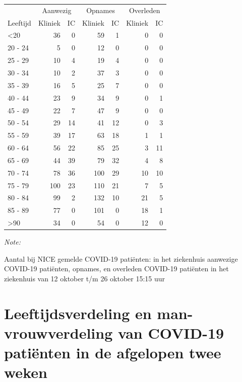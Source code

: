 \documentclass[
  english,
  man,floatsintext]{apa6}
\begin{document}
\begin{table}
\centering\begingroup\fontsize{10}{12}\selectfont

\begin{threeparttable}
\begin{tabular}{lrrrrrr}
\toprule
\multicolumn{1}{c}{ } & \multicolumn{2}{c}{Aanwezig} & \multicolumn{2}{c}{Opnames} & \multicolumn{2}{c}{Overleden} \\
\cmidrule(l{3pt}r{3pt}){2-3} \cmidrule(l{3pt}r{3pt}){4-5} \cmidrule(l{3pt}r{3pt}){6-7}
Leeftijd & Kliniek & IC & Kliniek & IC & Kliniek & IC\\
\midrule
<20 & 36 & 0 & 59 & 1 & 0 & 0\\
20 - 24 & 5 & 0 & 12 & 0 & 0 & 0\\
25 - 29 & 10 & 4 & 19 & 4 & 0 & 0\\
30 - 34 & 10 & 2 & 37 & 3 & 0 & 0\\
35 - 39 & 16 & 5 & 25 & 7 & 0 & 0\\
40 - 44 & 23 & 9 & 34 & 9 & 0 & 1\\
45 - 49 & 22 & 7 & 47 & 9 & 0 & 0\\
50 - 54 & 29 & 14 & 41 & 12 & 0 & 3\\
55 - 59 & 39 & 17 & 63 & 18 & 1 & 1\\
60 - 64 & 56 & 22 & 85 & 25 & 3 & 11\\
65 - 69 & 44 & 39 & 79 & 32 & 4 & 8\\
70 - 74 & 78 & 36 & 100 & 29 & 10 & 10\\
75 - 79 & 100 & 23 & 110 & 21 & 7 & 5\\
80 - 84 & 99 & 2 & 132 & 10 & 21 & 5\\
85 - 89 & 77 & 0 & 101 & 0 & 18 & 1\\
>90 & 34 & 0 & 54 & 0 & 12 & 0\\
\bottomrule
\end{tabular}
\begin{tablenotes}
\item \textit{Note: } 
\item Aantal bij NICE gemelde COVID-19 patiënten: in het ziekenhuis aanwezige COVID-19 patiënten, opnames, en overleden COVID-19 patiënten in het ziekenhuis van 12 oktober t/m 26 oktober 15:15 uur
\end{tablenotes}
\end{threeparttable}
\endgroup{}
\end{table}

\newpage

\hypertarget{leeftijdsverdeling-en-man-vrouwverdeling-van-covid-19-patiuxebnten-in-de-afgelopen-twee-weken}{%
\section{Leeftijdsverdeling en man-vrouwverdeling van COVID-19 patiënten in de afgelopen twee weken}\label{leeftijdsverdeling-en-man-vrouwverdeling-van-covid-19-patiuxebnten-in-de-afgelopen-twee-weken}}
\end{document}
